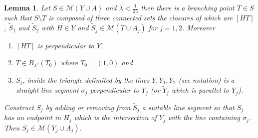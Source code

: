 \documentclass{article}
\newcommand{\M}{\mathcal{M}}
\newtheorem{lemma}[theorem]{Lemma}
\theoremstyle{definition}
\theoremstyle{remark}
\begin{document}
\begin{lemma}\label{lm:branching}
Let $S\in \M(Y\cup A)$
and $\lambda < \frac 1 {25}$ then
there is a branching point $T\in S$ 
such that $S\setminus T$ is composed of 
three connected sets the closures of which are
 $[HT]$, $\tilde S_1$ and $\tilde S_2$ 
with $H\in Y$ and  
$\tilde S_j \in \M(T\cup A_j)$ for $j=1,2$.
Moreover
\begin{enumerate}
  \item
 $[HT]$ is perpendicular to $Y$.
\item
$T\in B_{\lambda^2}(T_0)$
where $T_0=(1,0)$
and 
\item $\tilde S_j$, inside the triangle delimited by the lines 
$Y,\tilde Y_1,\tilde Y_2$ (see notation) is a straight line segment $\sigma_j$ 
perpendicular to 
$Y_j$ (or $\tilde Y_j$ which is parallel to $Y_j$).
\end{enumerate}
Construct $S_j$ by adding or removing from $\tilde S_j$ 
a suitable line segment so that $S_j$ has an endpoint in $H_j$ 
which is the intersection of $Y_j$ with the line containing 
$\sigma_j$.
Then $S_j \in \M(Y_j\cup A_j)$.
\end{lemma}
\end{document}
